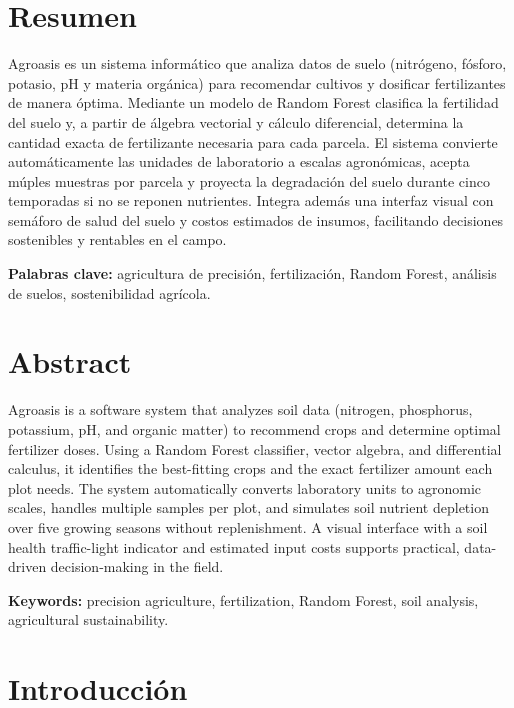 \documentclass[12pt]{article}
\begin{document}
\newpage
\section*{Resumen}

Agroasis es un sistema informático que analiza datos de suelo (nitrógeno, fósforo, potasio, pH y materia orgánica) para recomendar cultivos y dosificar fertilizantes de manera óptima. Mediante un modelo de Random Forest clasifica la fertilidad del suelo y, a partir de álgebra vectorial y cálculo diferencial, determina la cantidad exacta de fertilizante necesaria para cada parcela. El sistema convierte automáticamente las unidades de laboratorio a escalas agronómicas, acepta múples muestras por parcela y proyecta la degradación del suelo durante cinco temporadas si no se reponen nutrientes. Integra además una interfaz visual con semáforo de salud del suelo y costos estimados de insumos, facilitando decisiones sostenibles y rentables en el campo.

\medskip
\noindent\textbf{Palabras clave:} agricultura de precisión, fertilización, Random Forest, análisis de suelos, sostenibilidad agrícola.

\bigskip
\section*{Abstract}

Agroasis is a software system that analyzes soil data (nitrogen, phosphorus, potassium, pH, and organic matter) to recommend crops and determine optimal fertilizer doses. Using a Random Forest classifier, vector algebra, and differential calculus, it identifies the best-fitting crops and the exact fertilizer amount each plot needs. The system automatically converts laboratory units to agronomic scales, handles multiple samples per plot, and simulates soil nutrient depletion over five growing seasons without replenishment. A visual interface with a soil health traffic-light indicator and estimated input costs supports practical, data-driven decision-making in the field.

\medskip
\noindent\textbf{Keywords:} precision agriculture, fertilization, Random Forest, soil analysis, agricultural sustainability.

\newpage
\tableofcontents

\newpage
\listoffigures
\vspace{1.5cm}
\listoftables

\newpage
\section{Introducción}
\end{document}
